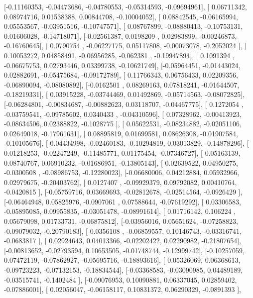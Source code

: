 \documentclass{article}
\begin{document}
       [-0.11160353, -0.04473686, -0.04780553, -0.05314593, -0.09694961],
       [ 0.06711342,  0.08974716,  0.01538388,  0.00844708, -0.10004052],
       [ 0.08842545, -0.06165994,  0.05553567, -0.03951516, -0.10747571],
       [ 0.08767899, -0.08880413, -0.10753131,  0.01606028, -0.14718071],
       [-0.02561387,  0.0198209 ,  0.02983899, -0.00246873, -0.16760645],
       [ 0.0790754 , -0.06227175,  0.05117808, -0.00073078, -0.2052024 ],
       [ 0.10053272,  0.04858491, -0.06956285, -0.062381  , -0.19947894],
       [ 0.1091394 , -0.06675753,  0.02793446,  0.03399738, -0.10621749],
       [-0.05964451, -0.01443024,  0.02882691, -0.05475684, -0.09172789],
       [ 0.11766343,  0.06756433,  0.02209356, -0.06890094, -0.08080892],
       [-0.0162501 ,  0.08269163,  0.07818241, -0.01644507, -0.18219331],
       [ 0.03915228, -0.03744469,  0.01492869, -0.05714563, -0.08072825],
       [-0.06284801, -0.00834687, -0.00882623,  0.03118707, -0.04467775],
       [ 0.1272054 , -0.03759541, -0.09785602,  0.0340433 , -0.04310596],
       [ 0.07328962, -0.00413923, -0.08634506,  0.02388822, -0.1028775 ],
       [ 0.05622531, -0.08234882, -0.02051106,  0.02649018, -0.17961631],
       [ 0.08895819,  0.01699581,  0.08626308, -0.01907584, -0.10105676],
       [-0.04434998, -0.02460183, -0.10294819,  0.03013829, -0.14878296],
       [ 0.01218253, -0.02247249, -0.11485771,  0.01175454, -0.07346727],
       [ 0.05163139,  0.08740767,  0.06910232, -0.01686951, -0.13805143],
       [ 0.02639522,  0.04950275, -0.0300508 , -0.08986753, -0.12280023],
       [-0.06680006,  0.04212884,  0.05932966,  0.02979675, -0.20403762],
       [ 0.0127407 , -0.09929379,  0.09792082,  0.00410764, -0.0420815 ],
       [-0.05759716,  0.03669693, -0.02812678, -0.02514564, -0.0926429 ],
       [-0.06464948,  0.05825976, -0.0907061 ,  0.07588644, -0.07619292],
       [ 0.03306583, -0.05895085,  0.09955835, -0.03051478, -0.08991614],
       [ 0.01716142,  0.106224  ,  0.05679098,  0.01733731, -0.06875812],
       [-0.03956016,  0.05651624, -0.07258823, -0.09079032, -0.20790183],
       [ 0.0356108 , -0.06859557,  0.10146743, -0.03316741, -0.0683817 ],
       [ 0.02924643,  0.04013366, -0.02202422,  0.02290982, -0.21807654],
       [-0.00813652, -0.02793594,  0.10653505, -0.01748744, -0.12999742],
       [-0.10257059,  0.07472119, -0.07862927, -0.05695716, -0.18893616],
       [ 0.05326069,  0.06368613, -0.09723223, -0.07132153, -0.18834544],
       [-0.03368583, -0.03090985,  0.04489189, -0.03515741, -0.1402484 ],
       [-0.09076953,  0.10090881,  0.06337045,  0.02859402, -0.07886001],
       [ 0.02056047, -0.06158117,  0.10831372,  0.06290329, -0.0891393 ],
\end{document}
